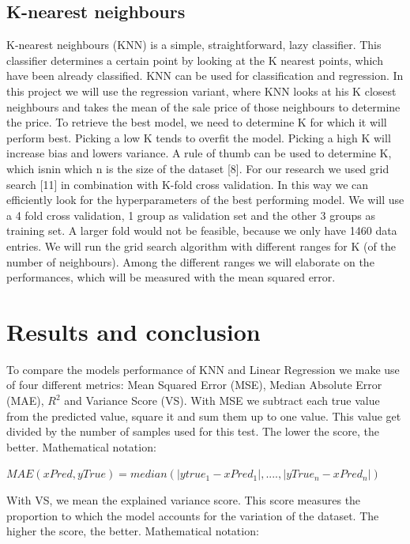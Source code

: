 \documentclass[a4paper,11pt]{article}
\begin{document}
\subsection{K-nearest neighbours}
K-nearest neighbours (KNN) is a simple, straightforward, lazy classifier. This classifier determines a certain point by looking at the K nearest points, which have been already classified. KNN can be used for classification and regression. In this project we will use the regression variant, where KNN looks at his K closest neighbours and takes the mean of the sale price of those neighbours to determine the price. To retrieve the best model, we need to determine K for which it will perform best. Picking a low K tends to overfit the model. Picking a high K will increase bias and lowers variance. A rule of thumb can be used to determine K, which isnin which n is the size of the dataset [8].
For our research we used grid search [11] in combination with K-fold cross validation. In this way we can efficiently look for the hyperparameters of the best performing model. We will use a 4 fold cross validation, 1 group as validation set and the other 3 groups as training set. A larger fold would not be feasible, because we only have 1460 data entries. We will run the grid search algorithm with different ranges for K (of the number of neighbours). Among the different ranges we will elaborate on the performances, which will be measured with the mean squared error. 


\section{Results and conclusion}
To compare the models performance of KNN and Linear Regression we make use of four different metrics: Mean Squared Error (MSE), Median Absolute Error (MAE), $R^2$ and Variance Score (VS). With MSE we subtract each true value from the predicted value, square it and sum them up to one value. This value get divided by the number of samples used for this test. The lower the score, the better. Mathematical notation:
\\

\begin{center}
$MAE(xPred,yTrue)=median(|ytrue_1-xPred_1|,....,|yTrue_n-xPred_n|)$
\end{center}

With VS, we mean the explained variance score. This score measures the proportion to which the model accounts for the variation of the dataset. The higher the score, the better. Mathematical notation:
\\
\end{document}
